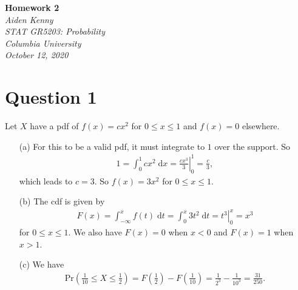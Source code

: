 \documentclass[10pt]{article}
\begin{document}
\newcommand{\mytitle}{Homework 2}
\newcommand{\myauthor}{Aiden Kenny}
\newcommand{\myclass}{STAT GR5203: Probability}
\newcommand{\myschool}{Columbia University}
\newcommand{\mydate}{October 12, 2020}
\begin{flushright}
    \textbf{\mytitle}\\[0.5em]
    \textsl{\myauthor}\\
    \textsl{\myclass}\\
    \textsl{\myschool}\\
    \textsl{\mydate}
\end{flushright} \vspace{1em}

\section{Question 1} \noindent
Let \(X\) have a pdf of \(f(x) = c x^2\) for \(0 \le x \le 1\) and \(f(x) = 0\) elsewhere. 
\begin{itemize}
    \item[(a)] For this to be a valid pdf, it must integrate to \(1\) over the support. So 
    \begin{align*}
        1 = \int_0^1 c x^2 \;\mathrm{d}x = \left. \frac{c x^3}{3} \right|_0^1 = \frac{c}{3},
    \end{align*}
    which leads to \(c = 3\). So \(f(x) = 3x^2\) for \(0 \le x \le 1\). 
    \item[(b)] The cdf is given by 
    \begin{align*}
        F(x) = \int_{-\infty}^x f(t) \;\mathrm{d}t = \int_0^x 3t^2 \;\mathrm{d}t = \left. t^3 \right|_0^x = x^3
    \end{align*}
    for \(0 \le x \le 1\). We also have \(F(x) = 0\) when \(x < 0\) and \(F(x) = 1\) when \(x > 1\).
    \item[(c)] We have 
    \begin{align*}
        \mathrm{Pr}\left(\frac{1}{10} \le X \le \frac{1}{2} \right) 
        = F\left( \frac{1}{2} \right) - F \left( \frac{1}{10} \right)
        = \frac{1}{2^3} - \frac{1}{10^3} = \frac{31}{250}.
    \end{align*}
\end{itemize}

\end{document}
